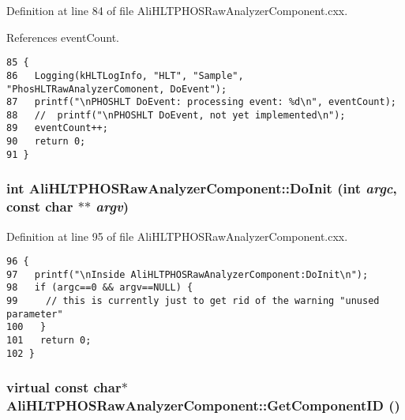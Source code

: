 Definition at line 84 of file Ali\-HLTPHOSRaw\-Analyzer\-Component.cxx.

References event\-Count.

\footnotesize\begin{verbatim}85 {
86   Logging(kHLTLogInfo, "HLT", "Sample", "PhosHLTRawAnalyzerComonent, DoEvent");
87   printf("\nPHOSHLT DoEvent: processing event: %d\n", eventCount);
88   //  printf("\nPHOSHLT DoEvent, not yet implemented\n");
89   eventCount++;
90   return 0;
91 }
\end{verbatim}\normalsize 


\subsubsection{\setlength{\rightskip}{0pt plus 5cm}int Ali\-HLTPHOSRaw\-Analyzer\-Component::Do\-Init (int {\em argc}, const char $\ast$$\ast$ {\em argv})\hspace{0.3cm}{\tt  [virtual]}}\label{classAliHLTPHOSRawAnalyzerComponent_AliHLTPHOSRawAnalyzerPeakFinderComponenta6}




Definition at line 95 of file Ali\-HLTPHOSRaw\-Analyzer\-Component.cxx.

\footnotesize\begin{verbatim}96 {
97   printf("\nInside AliHLTPHOSRawAnalyzerComponent:DoInit\n");
98   if (argc==0 && argv==NULL) {
99     // this is currently just to get rid of the warning "unused parameter"
100   }
101   return 0;
102 }
\end{verbatim}\normalsize 


\subsubsection{\setlength{\rightskip}{0pt plus 5cm}virtual const char$\ast$ Ali\-HLTPHOSRaw\-Analyzer\-Component::Get\-Component\-ID ()\hspace{0.3cm}{\tt  [pure virtual]}}\label{classAliHLTPHOSRawAnalyzerComponent_AliHLTPHOSRawAnalyzerComponenta7}




